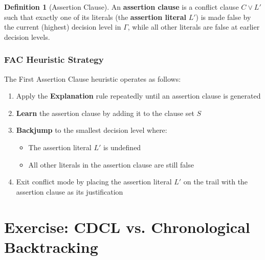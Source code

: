 \documentclass[11pt,a4paper]{article}
\theoremstyle{definition}
\newtheorem{definition}{Definition}[section]
\theoremstyle{plain}
\theoremstyle{remark}
\begin{document}
\begin{tcolorbox}[colback=yellow!10!white,colframe=yellow!75!black,title=\textbf{Assertion Clause}]
\begin{definition}[Assertion Clause]
An \textbf{assertion clause} is a conflict clause $C \lor L'$ such that exactly one of its literals (the \textbf{assertion literal} $L'$) is made false by the current (highest) decision level in $\varGamma$, while all other literals are false at earlier decision levels.
\end{definition}
\end{tcolorbox}

\subsubsection{FAC Heuristic Strategy}

The First Assertion Clause heuristic operates as follows:

\begin{enumerate}
    \item Apply the \textbf{Explanation} rule repeatedly until an assertion clause is generated
    \item \textbf{Learn} the assertion clause by adding it to the clause set $S$
    \item \textbf{Backjump} to the smallest decision level where:
    \begin{itemize}
        \item The assertion literal $L'$ is undefined
        \item All other literals in the assertion clause are still false
    \end{itemize}
    \item Exit conflict mode by placing the assertion literal $L'$ on the trail with the assertion clause as its justification
\end{enumerate}



\newpage
\section{Exercise: CDCL vs. Chronological Backtracking}
\end{document}
